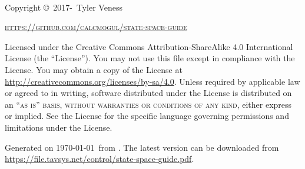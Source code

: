 ~\vfill
\thispagestyle{empty}

Copyright \copyright\ 2017-\unskip~Tyler Veness

\textsc{\url{https://github.com/calcmogul/state-space-guide}}

Licensed under the Creative Commons Attribution-ShareAlike 4.0 International
License (the ``License''). You may not use this file except in compliance with
the License. You may obtain a copy of the License at
\url{http://creativecommons.org/licenses/by-sa/4.0}. Unless required by
applicable law or agreed to in writing, software distributed under the License
is distributed on an \textsc{``as is'' basis, without warranties or conditions
of any kind}, either express or implied. See the License for the specific
language governing permissions and limitations under the License.

Generated on \monthdayyeardate\today~from \unskip.
The latest version can be downloaded from
\url{https://file.tavsys.net/control/state-space-guide.pdf}.
